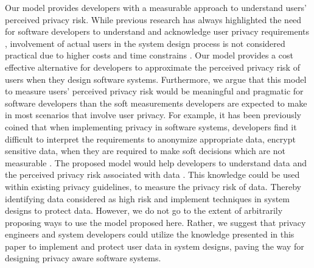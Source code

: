 \documentclass[10pt]{article}
\begin{document}
Our model provides developers with a measurable approach to understand users' perceived privacy risk. While previous research has always highlighted the need for software developers to understand and acknowledge user privacy requirements \cite {senarath2018under, ayalon2018crowdsourcing}, involvement of actual users in the system design process is not considered practical due to higher costs and time constrains \cite {senarath2017designing}. Our model provides a cost effective alternative for developers to approximate the perceived privacy risk of users when they design software systems. Furthermore, we argue that this model to measure users' perceived privacy risk would be meaningful and pragmatic for software developers than the soft measurements developers are expected to make in most scenarios that involve user privacy. For example, it has been previously coined that when implementing privacy in software systems, developers find it difficult to interpret the requirements to anonymize appropriate data, encrypt sensitive data, when they are required to make soft decisions which are not measurable \cite {senarath2018why}. The proposed model would help developers to understand data and the perceived privacy risk associated with data  \cite {marr2015big}. This knowledge could be used within existing privacy guidelines, to measure the privacy risk of data. Thereby identifying data considered as high risk and implement techniques in system designs to protect data. However, we do not go to the extent of arbitrarily proposing ways to use the model proposed here. Rather, we suggest that privacy engineers and system developers could utilize the knowledge presented in this paper to implement and protect user data in system designs, paving the way for designing privacy aware software systems.
\end{document}
